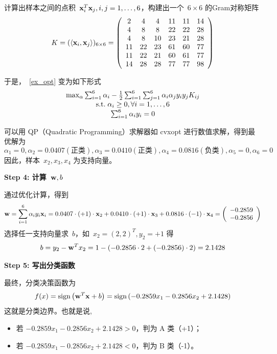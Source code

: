 计算出样本之间的点积~${\bf x}_i^T {\bf x}_j,i,j=1,\dots, 6$，构建出一个~$ 6\times 6$ 的Gram对称矩阵
\[
K =( \langle {\bf x}_i, {\bf x}_j \rangle)_{6\times 6} =
\left(
\begin{array}{cccccc} 
2 &  4  & 4 & 11  & 11   &14\\
4 &  8  & 8 & 22 & 22 &28 \\
4 &  8  & 10 & 23& 21&28 \\
11 &  22  &23  & 61& 60& 77 \\
11 & 22  &21 & 60& 61& 77 \\
14 & 28  & 28  &77 & 77 & 98 \\
\end{array} \right)
\]

于是，~\eqref{ex_opt} 变为如下形式
\begin{equation*}
\begin{array}{c}
{\rm max}_{\alpha} \sum_{i=1}^6 \alpha_i -\frac{1}{2} \sum_{i=1}^6 \sum_{j=1}^6 \alpha_i \alpha_j y_i y_j K_{ij} \\
{\rm s.t.} \; \alpha_i \ge 0, \forall i=1, \dots, 6 \\
  \sum_{i=1}^6 \alpha_i y_i =0
  \end{array}
\end{equation*}

可以用 QP（Quadratic Programming）求解器如 cvxopt 进行数值求解，得到最优解为
$$
 \alpha_1 =0,  \alpha_2 =0.0407(\mbox{正类}), \alpha_3 =0.0410(\mbox{正类}) , \alpha_4 =0.0816(\mbox{负类}), \alpha_5 =0, \alpha_6 =0 
$$
因此，样本~$x_2,x_3,x_4$ 为支持向量。

\vspace{0.5em}
\textbf{Step 4: 计算~${\bf w},b$}

通过优化计算，得到
$$
{\bf w}= \sum_{i=1}^6 \alpha_i y_i {\bf x}_i = 0.0407\cdot (+1) \cdot {\bf x}_2 +0.0410\cdot (+1) \cdot {\bf x}_3+0.0816\cdot (-1) \cdot {\bf x}_4 = \left(\begin{array}{c} -0.2859 \\ -0.2856\end{array}\right)
$$
选择任一支持向量求~$b$，如~$x_2 = \left( 2,2\right)^T, y_2= +1$ 得
$$
b= y_2 -{\bf w}^T x_2 = 1-(-0.2856\cdot 2 +(-0.2856)\cdot 2) =2.1428
$$

\vspace{0.5em}
\textbf{Step 5: 写出分类函数}

最终，分类决策函数为
\[
f(x) = \text{sign} \left( {\bf w}^T {\bf x}+b \right)= \text{sign}\left(-0.2859x_1 -0.2856 x_2 +2.1428\right)
\]
这就是分类边界。也就是说,
\begin{itemize}
\item 若 $-0.2859x_1 -0.2856 x_2 +2.1428 > 0$，判为 A 类（+1）；
\item 若 $-0.2859x_1 -0.2856 x_2 +2.1428 <  0$，判为 B 类（-1）。
\end{itemize}

